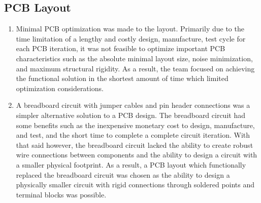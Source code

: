 \documentclass[12pt, titlepage]{article}
\begin{document}
\subsection{PCB Layout}
\begin{enumerate}
  \item Minimal PCB optimization was made to the layout. Primarily due to the time limitation of a lengthy and costly design, manufacture, test cycle for each PCB iteration, it was not feasible to optimize important PCB characteristics such as the absolute minimal layout size, noise minimization, and maximum structural rigidity. As a result, the team focused on achieving the functional solution in the shortest amount of time which limited optimization considerations.
  \item A breadboard circuit with jumper cables and pin header connections was a simpler alternative solution to a PCB design. The breadboard circuit had some benefits such as the inexpensive monetary cost to design, manufacture, and test, and the short time to complete a complete circuit iteration. With that said however, the breadboard circuit lacked the ability to create robust wire connections between components and the ability to design a circuit with a smaller physical footprint. As a result, a PCB layout which functionally replaced the breadboard circuit was chosen as the ability to design a physically smaller circuit with rigid connections through soldered points and terminal blocks was possible.
\end{enumerate}










\end{document}
